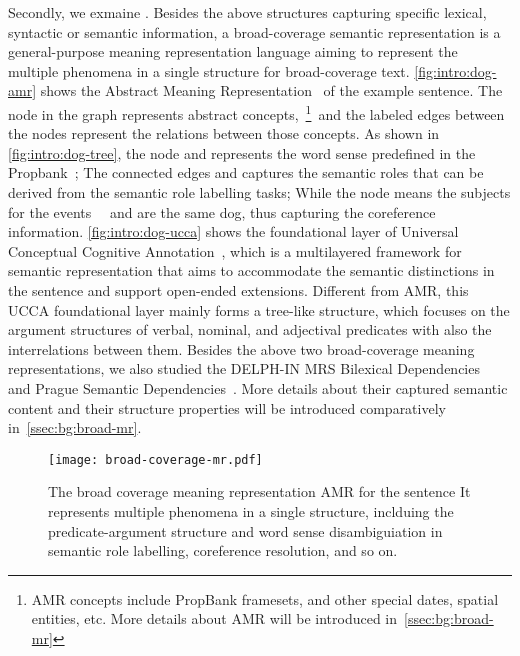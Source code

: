 Secondly, we exmaine . Besides the above structures capturing specific
lexical, syntactic or semantic information, a broad-coverage semantic
representation is a general-purpose meaning representation language
aiming to represent the multiple phenomena in a single structure for
broad-coverage text. \autoref{fig:intro:dog-amr} shows the Abstract
Meaning Representation~\citep[,][]{Ban:Bon:Cai:13} of the
example sentence. The node in the graph represents abstract
concepts,~\footnote{AMR concepts include PropBank framesets, and other
  special dates, spatial entities, etc. More details about AMR will be
  introduced in~\autoref{ssec:bg:broad-mr}}~and the labeled edges
between the nodes represent the relations between those concepts. As
shown in \autoref{fig:intro:dog-tree}, the node  and
 represents the word sense predefined in the
Propbank~\cite{Kin:Pal:02}; The connected edges  and
 captures the semantic roles that can be derived from
the semantic role labelling tasks; While the node 
means the subjects for the events ~~and
 are the same dog, thus capturing the coreference
information. \autoref{fig:intro:dog-ucca} shows the foundational layer
of Universal Conceptual Cognitive
Annotation~\citep[,][]{Abe:Rap:13b}, which is a multilayered
framework for semantic representation that aims to accommodate the
semantic distinctions in the sentence and support open-ended
extensions. Different from AMR, this UCCA foundational layer mainly
forms a tree-like structure, which focuses on the argument structures
of verbal, nominal, and adjectival predicates with also the
interrelations between them. Besides the above two broad-coverage
meaning representations, we also studied the DELPH-IN MRS Bilexical
Dependencies~\citep[,][]{Iva:Oep:Ovr:12} and Prague Semantic
Dependencies~\citep[,][]{hajic2012announcing,miyao2014house}. More
details about their captured semantic content and their structure
properties will be introduced comparatively
in~\autoref{ssec:bg:broad-mr}.

\begin{figure}[!tbp]
\begin{center}
\texttt{[image: broad-coverage-mr.pdf]}
\end{center}
\caption{\label{fig:intro:dog-amr} The broad coverage meaning
  representation AMR for the sentence \emph{} It represents multiple
  phenomena in a single structure, inclduing the predicate-argument
  structure and word sense disambiguiation in semantic role labelling,
  coreference resolution, and so on.}
\end{figure}


